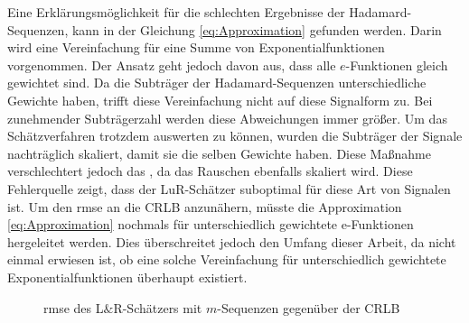 Eine Erklärungsmöglichkeit für die schlechten Ergebnisse der Hadamard-Sequenzen, kann in der Gleichung \eqref{eq:Approximation} gefunden werden. Darin wird eine Vereinfachung für eine Summe von Exponentialfunktionen vorgenommen. Der Ansatz geht jedoch davon aus, dass alle $e$-Funktionen gleich gewichtet sind. Da die Subträger der Hadamard-Sequenzen unterschiedliche Gewichte haben, trifft diese Vereinfachung nicht auf diese Signalform zu. Bei zunehmender Subträgerzahl werden diese Abweichungen immer größer. Um das Schätzverfahren trotzdem auswerten zu können, wurden die Subträger der Signale nachträglich skaliert, damit sie die selben Gewichte haben. Diese Maßnahme verschlechtert jedoch das , da das Rauschen ebenfalls skaliert wird. Diese Fehlerquelle zeigt, dass der \gls{LuR}-Schätzer suboptimal für diese Art von Signalen ist. Um den \gls{rmse} an die \gls{CRLB} anzunähern, müsste die Approximation \eqref{eq:Approximation} nochmals für unterschiedlich gewichtete e-Funktionen hergeleitet werden. Dies überschreitet jedoch den Umfang dieser Arbeit, da nicht einmal erwiesen ist, ob eine solche Vereinfachung für unterschiedlich gewichtete Exponentialfunktionen überhaupt existiert. 

\begin{figure}[htbp]
	\centering
	\caption{\gls{rmse} des L$\&$R-Schätzers mit $m$-Sequenzen gegenüber der \gls{CRLB}}
	\label{fig:m_LuR_CRLB_vergleich}
\end{figure}

